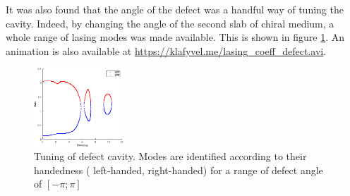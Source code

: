 It was also found that the angle of the defect was a handful way of tuning the cavity. Indeed, by changing the angle of the second slab of chiral medium, a whole range of lasing modes was made available. This is shown in figure \ref{fig:defect_cavity:tuning}. An animation is also available at \url{https://klafyvel.me/lasing_coeff_defect.avi}.
\begin{figure} %
	\capstart
	\centering
	\includegraphics[width=0.30\textwidth]{plots/defect/tuning}
	\caption[Tuning of defect cavity]{Tuning of defect cavity. Modes are identified according to their handedness (\protect{} left-handed, \protect{} right-handed) for a range of defect angle of $[-\pi;\pi]$}
	\label{fig:defect_cavity:tuning}
\end{figure}

